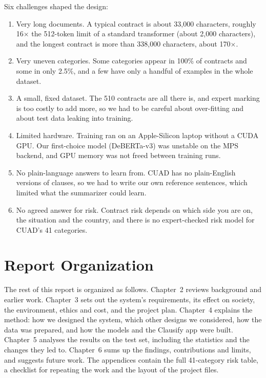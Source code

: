 Six challenges shaped the design:
\begin{enumerate}[itemsep=2pt]
  \item Very long documents. A typical contract is about 33{,}000 characters, roughly 16$\times$ the 512-token limit of a standard transformer (about 2{,}000 characters), and the longest contract is more than 338{,}000 characters, about 170$\times$.
  \item Very uneven categories. Some categories appear in 100\% of contracts and some in only 2.5\%, and a few have only a handful of examples in the whole dataset.
  \item A small, fixed dataset. The 510 contracts are all there is, and expert marking is too costly to add more, so we had to be careful about over-fitting and about test data leaking into training.
  \item Limited hardware. Training ran on an Apple-Silicon laptop without a CUDA GPU. Our first-choice model (DeBERTa-v3) was unstable on the MPS backend, and GPU memory was not freed between training runs.
  \item No plain-language answers to learn from. CUAD has no plain-English versions of clauses, so we had to write our own reference sentences, which limited what the summarizer could learn.
  \item No agreed answer for risk. Contract risk depends on which side you are on, the situation and the country, and there is no expert-checked risk model for CUAD's 41 categories.
\end{enumerate}

\section{Report Organization}
The rest of this report is organized as follows. Chapter~2 reviews background and earlier work. Chapter~3 sets out the system's requirements, its effect on society, the environment, ethics and cost, and the project plan. Chapter~4 explains the method: how we designed the system, which other designs we considered, how the data was prepared, and how the models and the Clausify app were built. Chapter~5 analyses the results on the test set, including the statistics and the changes they led to. Chapter~6 sums up the findings, contributions and limits, and suggests future work. The appendices contain the full 41-category risk table, a checklist for repeating the work and the layout of the project files.

